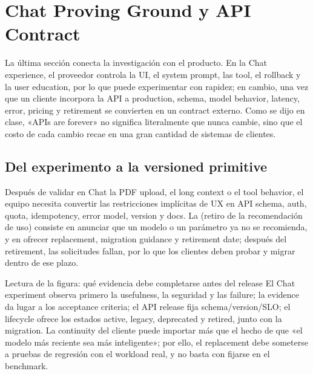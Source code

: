 \section{Chat Proving Ground y API Contract}

La última sección conecta la investigación con el producto. En la Chat experience, el proveedor controla la UI, el system prompt, las tool, el rollback y la user education, por lo que puede experimentar con rapidez; en cambio, una vez que un cliente incorpora la API a production, schema, model behavior, latency, error, pricing y retirement se convierten en un contract externo. Como se dijo en clase, «APIs are forever» no significa literalmente que nunca cambie, sino que el costo de cada cambio recae en una gran cantidad de sistemas de clientes.

\subsection{Del experimento a la versioned primitive}

Después de validar en Chat la PDF upload, el long context o el tool behavior, el equipo necesita convertir las restricciones implícitas de UX en API schema, auth, quota, idempotency, error model, version y docs. La  (retiro de la recomendación de uso) consiste en anunciar que un modelo o un parámetro ya no se recomienda, y en ofrecer replacement, migration guidance y retirement date; después del retirement, las solicitudes fallan, por lo que los clientes deben probar y migrar dentro de ese plazo.


\begin{knowledgebox}{Lectura de la figura: qué evidencia debe completarse antes del release}
El Chat experiment observa primero la usefulness, la seguridad y las failure; la evidence da lugar a los acceptance criteria; el API release fija schema/version/SLO; el lifecycle ofrece los estados active, legacy, deprecated y retired, junto con la migration. La continuity del cliente puede importar más que el hecho de que «el modelo más reciente sea más inteligente»; por ello, el replacement debe someterse a pruebas de regresión con el workload real, y no basta con fijarse en el benchmark.
\end{knowledgebox}

